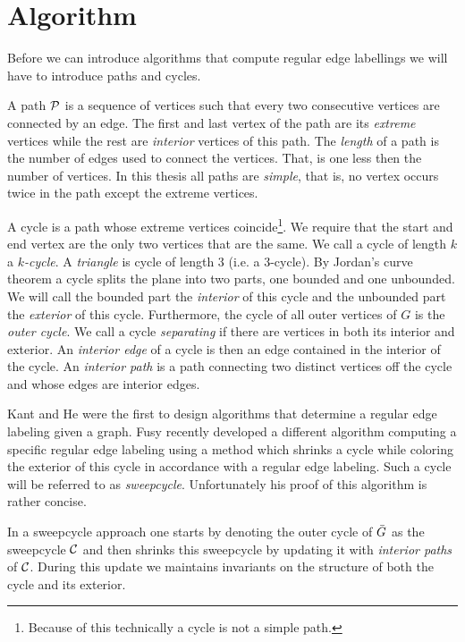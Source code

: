 
\section{Algorithm}
\thispagestyle{plain}
\label{s:algo}

Before we can introduce algorithms that compute regular edge labellings we will have to introduce paths and cycles.

A path $\P$ is a sequence of vertices such that every two consecutive vertices are connected by an edge. The first and last vertex of the path are its \emph{extreme} vertices while the rest are \emph{interior} vertices of this path. The \emph{length} of a path is the number of edges used to connect the vertices. That, is one less then the number of vertices. In this thesis all paths are \emph{simple}, that is, no vertex occurs twice in the path except the extreme vertices.

A cycle is a path whose extreme vertices coincide\footnote{Because of this technically a cycle is not a simple path.}. We require that the start and end vertex are the only two vertices that are the same. We call a cycle of length $k$  a \emph{$k$-cycle}. A \emph{triangle} is cycle of length $3$ (i.e. a $3$-cycle). By Jordan's curve theorem a cycle splits the plane into two parts, one bounded and one unbounded. We will call the bounded part the \emph{interior} of this cycle and the unbounded part the \emph{exterior} of this cycle.
Furthermore, the cycle of all outer vertices of $G$ is the \emph{outer cycle}.
We call a cycle \emph{separating} if there are vertices in both its interior and exterior.
An \emph{interior edge} of a cycle is then an edge contained in the interior of the cycle.
An \emph{interior path} is a path connecting two distinct vertices off the cycle and whose edges are interior edges.

Kant and He \cite{Kant1997} were the first to design algorithms that determine a regular edge labeling given a graph. Fusy \cite{Fusy2006} recently developed a different algorithm computing a specific regular edge labeling using a method which shrinks a cycle while coloring the exterior of this cycle in accordance with a regular edge labeling. Such a cycle will be referred to as \emph{sweepcycle}. Unfortunately his proof of this algorithm is rather concise.

In a sweepcycle approach one starts by denoting the outer cycle of $\ext G$ as the sweepcycle $\C$ and then shrinks this sweepcycle by updating it with \emph{interior paths} of $\C$. During this update we maintains invariants on the structure of both the cycle and its exterior.

